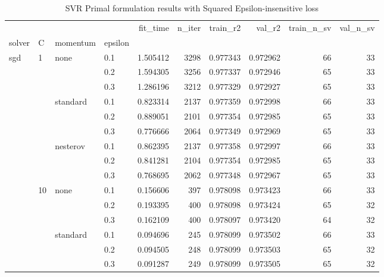 \begin{table}[H]
\centering
\caption{SVR Primal formulation results with Squared Epsilon-insensitive loss}
\label{primal_svr_squared_eps_cv_results}
\begin{tabular}{llllrrrrrr}
\toprule
          &     &   &     &  fit\_time &  n\_iter &  train\_r2 &    val\_r2 &  train\_n\_sv &  val\_n\_sv \\
solver & C & momentum & epsilon &           &         &           &           &             &           \\
\midrule
sgd & 1   & none & 0.1 &  1.505412 &    3298 &  0.977343 &  0.972962 &          66 &        33 \\
          &     &   & 0.2 &  1.594305 &    3256 &  0.977337 &  0.972946 &          65 &        33 \\
          &     &   & 0.3 &  1.286196 &    3212 &  0.977329 &  0.972927 &          65 &        33 \\
          &     & standard & 0.1 &  0.823314 &    2137 &  0.977359 &  0.972998 &          66 &        33 \\
          &     &   & 0.2 &  0.889051 &    2101 &  0.977354 &  0.972985 &          65 &        33 \\
          &     &   & 0.3 &  0.776666 &    2064 &  0.977349 &  0.972969 &          65 &        33 \\
          &     & nesterov & 0.1 &  0.862395 &    2137 &  0.977358 &  0.972997 &          66 &        33 \\
          &     &   & 0.2 &  0.841281 &    2104 &  0.977354 &  0.972985 &          65 &        33 \\
          &     &   & 0.3 &  0.768695 &    2062 &  0.977348 &  0.972967 &          65 &        33 \\
          & 10  & none & 0.1 &  0.156606 &     397 &  0.978098 &  0.973423 &          66 &        33 \\
          &     &   & 0.2 &  0.193395 &     400 &  0.978098 &  0.973424 &          65 &        32 \\
          &     &   & 0.3 &  0.162109 &     400 &  0.978097 &  0.973420 &          64 &        32 \\
          &     & standard & 0.1 &  0.094696 &     245 &  0.978099 &  0.973502 &          66 &        33 \\
          &     &   & 0.2 &  0.094505 &     248 &  0.978099 &  0.973503 &          65 &        32 \\
          &     &   & 0.3 &  0.091287 &     249 &  0.978099 &  0.973505 &          65 &        32 \\

\end{tabular}
\end{table}
